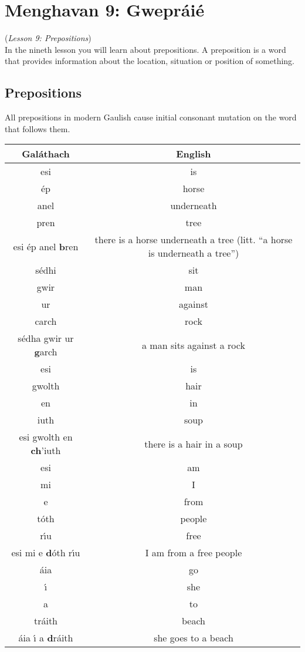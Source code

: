 \section{Menghavan 9: Gwepr\'{a}i\'{e}}
(\textit{Lesson 9: Prepositions})\\

In the nineth lesson you will learn about prepositions. A preposition is a word that provides information about the location, situation or position of something.

\subsection{Prepositions}

All prepositions in modern Gaulish cause initial consonant mutation on the word that follows them.
\begin{table}[H]
\centering
\begin{tabular}{c|c}
  \textbf{Gal\'{a}thach} & \textbf{English}\\
  \toprule
  esi & is\\
  \'{e}p & horse\\
  anel & underneath\\
  pren & tree\\
  esi \'{e}p anel \textbf{b}ren & there is a horse underneath a tree (litt. ``a horse is underneath a tree'')\\
  \midrule
  s\'{e}dhi & sit\\
  gwir & man\\
  ur & against\\
  carch & rock\\
  s\'{e}dha gwir ur \textbf{g}arch & a man sits against a rock\\
  \midrule
  esi & is\\
  gwolth & hair\\
  en & in\\
  iuth & soup\\
  esi gwolth en \textbf{ch}'iuth & there is a hair in a soup\\
  \midrule
  esi & am\\
  mi & I\\
  e & from\\
  t\'{o}th & people\\
  r\'{\i}u & free\\
  esi mi e \textbf{d}\'{o}th r\'{\i}u & I am from a free people\\
  \midrule
  \'{a}ia & go\\
  \'{\i} & she\\
  a & to\\
  tr\'{a}ith & beach\\
  \'{a}ia \'{\i} a \textbf{d}r\'{a}ith & she goes to a beach
\end{tabular}
\label{examples_prepositions}
\end{table}

